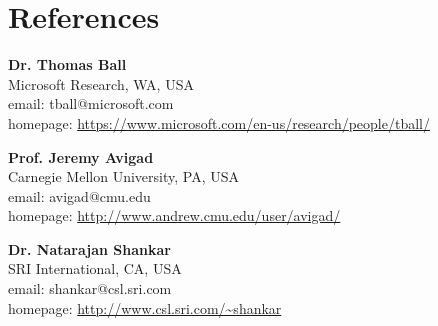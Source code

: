 \documentclass{article}
\newcommand{\REF}[2]{\begin{flushleft} {\bf #1} \\
                                                                           #2
                                         \end{flushleft}
                    }
\begin{document}
\section*{References}

\REF{Dr. Thomas Ball}
    {Microsoft Research, WA, USA \\
     email: tball@microsoft.com \\
     homepage:   \url{https://www.microsoft.com/en-us/research/people/tball/}
}

\REF{Prof. Jeremy Avigad}
    {Carnegie Mellon University, PA, USA \\
     email: avigad@cmu.edu \\
     homepage: \url{http://www.andrew.cmu.edu/user/avigad/}
    }

\REF{Dr. Natarajan Shankar}
    {SRI International, CA, USA \\
    email: shankar@csl.sri.com \\
    homepage: \url{http://www.csl.sri.com/\~shankar} \\
    }
\end{document}
